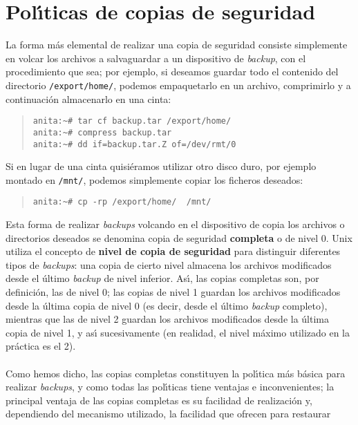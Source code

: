 \section{Pol\'{\i}ticas de copias de seguridad}
La forma m\'as elemental de realizar una copia de seguridad consiste simplemente
en volcar los archivos a salvaguardar a un dispositivo de {\it backup}, con
el procedimiento que sea; por ejemplo, si deseamos guardar todo el contenido
del directorio {\tt /export/home/}, podemos empaquetarlo en un archivo, 
comprimirlo y a continuaci\'on almacenarlo en una cinta:
\tt
\begin{quote}
\begin{verbatim}
anita:~# tar cf backup.tar /export/home/ 
anita:~# compress backup.tar
anita:~# dd if=backup.tar.Z of=/dev/rmt/0
\end{verbatim}
\end{quote}
\rm
Si en lugar de una cinta quisi\'eramos utilizar otro disco duro, por ejemplo
montado en {\tt /mnt/}, podemos simplemente copiar los ficheros deseados:
\tt
\begin{quote}
\begin{verbatim}
anita:~# cp -rp /export/home/  /mnt/
\end{verbatim}
\end{quote}
\rm
Esta forma de realizar {\it backups} volcando en el dispositivo de copia los
archivos o directorios deseados se denomina copia de seguridad {\bf completa} o
de nivel 0. Unix utiliza el concepto de {\bf nivel de copia de seguridad} para
distinguir diferentes tipos de {\it backups}: una copia de cierto nivel 
almacena los archivos modificados desde el \'ultimo {\it backup} de nivel 
inferior. As\'{\i}, las copias completas son, por definici\'on, las de nivel 0;
las copias de nivel 1 guardan los archivos modificados desde la \'ultima copia
de nivel 0 (es decir, desde el \'ultimo {\it backup} completo), mientras que
las de nivel 2 guardan los archivos modificados desde la \'ultima copia de
nivel 1, y as\'{\i} sucesivamente (en realidad, el nivel m\'aximo utilizado en
la pr\'actica es el 2).\\
\\Como hemos dicho, las copias completas constituyen la pol\'{\i}tica m\'as 
b\'asica para realizar {\it 
backups}, y como todas las pol\'{\i}ticas tiene ventajas e inconvenientes;
la principal ventaja de las copias completas es su facilidad de realizaci\'on
y, dependiendo del mecanismo utilizado, la facilidad que ofrecen para restaurar
